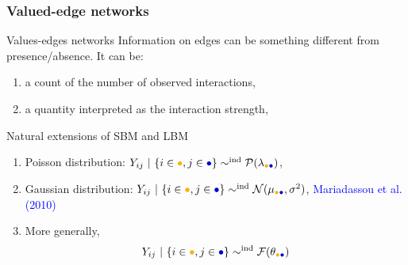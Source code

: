\documentclass[compress,10pt]{beamer}
\begin{document}
\begin{frame}
 \frametitle{Valued-edge networks}
 

\begin{block}{Values-edges networks}
 Information on edges can be something different from presence/absence.
 It can be:
 \begin{enumerate}
  \item a count of the number of observed interactions,
  \item a quantity interpreted as the interaction strength,
  \end{enumerate}

 \end{block}

 \bigskip
 
 


\begin{block}{ Natural extensions of SBM and LBM}
 \begin{enumerate}
  \item Poisson distribution: $Y_{ij} \ | \ \{i\in\textcolor{yellow!40!orange}{\bullet},j\in\textcolor{blue!80!black}{\bullet}\}
\sim^{\text{ind}} \mathcal{P}(\lambda_{\textcolor{yellow!40!orange}{\bullet}\textcolor{blue!80!black}{\bullet}})$,
 \item Gaussian distribution: $Y_{ij} \ | \ \{i\in\textcolor{yellow!40!orange}{\bullet},j\in\textcolor{blue!80!black}{\bullet}\}
\sim^{\text{ind}} \mathcal{N}(\mu_{\textcolor{yellow!40!orange}{\bullet}\textcolor{blue!80!black}{\bullet}},\sigma^2)$,
\textcolor{blue}{Mariadassou et al. (2010)}
\item More generally, 
  $$Y_{ij} \ | \ \{i\in\textcolor{yellow!40!orange}{\bullet},j\in\textcolor{blue!80!black}{\bullet}\}
\sim^{\text{ind}} \mathcal{F}(\theta_{\textcolor{yellow!40!orange}{\bullet}\textcolor{blue!80!black}{\bullet}})$$
 \end{enumerate}
 \end{block}
 \bigskip

\end{frame}



\end{document}
